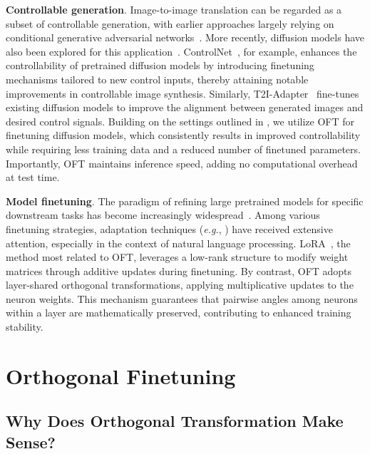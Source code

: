 \textbf{Controllable generation}. Image-to-image translation can be regarded as a subset of controllable generation, with earlier approaches largely relying on conditional generative adversarial networks~\cite{isola2017image,zhu2017toward,wang2018high,park2019semantic,choi2018stargan}. More recently, diffusion models have also been explored for this application~\cite{saharia2022palette,voynov2022sketch,wang2022pretraining}. ControlNet~\cite{zhang2023adding}, for example, enhances the controllability of pretrained diffusion models by introducing finetuning mechanisms tailored to new control inputs, thereby attaining notable improvements in controllable image synthesis. Similarly, T2I-Adapter~\cite{mou2023t2i} fine-tunes existing diffusion models to improve the alignment between generated images and desired control signals. Building on the settings outlined in \cite{zhang2023adding,mou2023t2i}, we utilize OFT for finetuning diffusion models, which consistently results in improved controllability while requiring less training data and a reduced number of finetuned parameters. Importantly, OFT maintains inference speed, adding no computational overhead at test time.

\textbf{Model finetuning}. The paradigm of refining large pretrained models for specific downstream tasks has become increasingly widespread~\cite{devlin2018bert,brown2020language,he2022masked}. Among various finetuning strategies, adaptation techniques (\emph{e.g.}, \cite{hulora2022,houlsby2019parameter,pfeiffer2020adapterfusion}) have received extensive attention, especially in the context of natural language processing. LoRA~\cite{hulora2022}, the method most related to OFT, leverages a low-rank structure to modify weight matrices through additive updates during finetuning. By contrast, OFT adopts layer-shared orthogonal transformations, applying multiplicative updates to the neuron weights. This mechanism guarantees that pairwise angles among neurons within a layer are mathematically preserved, contributing to enhanced training stability.

\section{Orthogonal Finetuning}

\subsection{Why Does Orthogonal Transformation Make Sense?}

